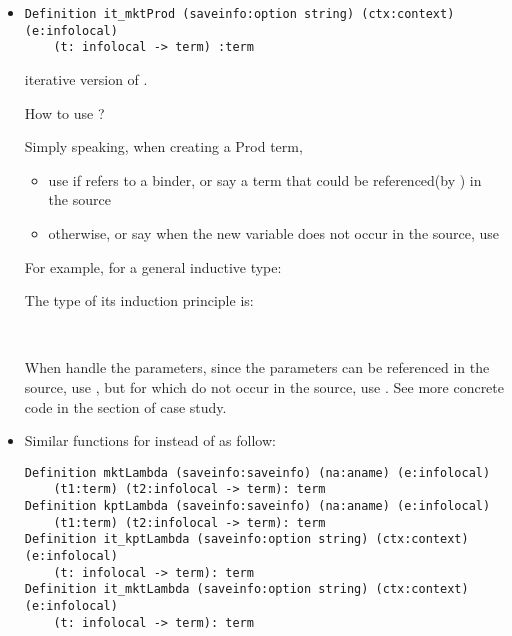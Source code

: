 \documentclass[a4paper,UKenglish,cleveref, autoref, thm-restate]{lipics-v2021}
\begin{document}
\begin{itemize}
\item
\begin{lstlisting}[language = {Coq}, basicstyle = \small]
Definition it_mktProd (saveinfo:option string) (ctx:context) (e:infolocal) 
    (t: infolocal -> term) :term
\end{lstlisting}
iterative version of .




\begin{remark}\label{choosetProd}
How to use  ?

Simply speaking, when creating a Prod term,

\begin{itemize}
    \item use  if  refers to a binder, or say a term that could be referenced(by ) in the source
    \item otherwise, or say when the new variable does not occur in the source, use  
\end{itemize}

  

  For example, for a general inductive type:


The type of its induction principle is:


~~

When handle the parameters, since the parameters can be referenced in the source, use , but for  which do not occur in the source, use . See more concrete code in the section of case study.
\end{remark}


\item
Similar functions for  instead of  as follow:
\begin{lstlisting}[language = {Coq}, basicstyle = \small]
Definition mktLambda (saveinfo:saveinfo) (na:aname) (e:infolocal) 
    (t1:term) (t2:infolocal -> term): term
Definition kptLambda (saveinfo:saveinfo) (na:aname) (e:infolocal) 
    (t1:term) (t2:infolocal -> term): term
Definition it_kptLambda (saveinfo:option string) (ctx:context) (e:infolocal) 
    (t: infolocal -> term): term
Definition it_mktLambda (saveinfo:option string) (ctx:context) (e:infolocal) 
    (t: infolocal -> term): term
\end{lstlisting}

    
\end{itemize}
\end{document}
